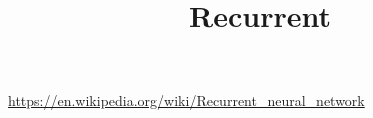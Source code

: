 \documentclass[a4paper]{article}
\title{Recurrent}
\date{}
\begin{document}
    \maketitle

    \url{https://en.wikipedia.org/wiki/Recurrent_neural_network}
\end{document}
